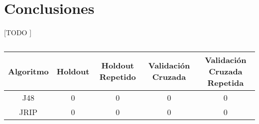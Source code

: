 \documentclass{article}
\begin{document}
	\section{Conclusiones}
	\label{sec:conclusions}

		\paragraph{}
		[TODO ]

		\begin{table}[h]
			\centering
			\begin{tabular}{ | c || c | c | c | c |}
			\hline
			Algoritmo	&	Holdout & Holdout Repetido 	& Validación Cruzada 	& Validación Cruzada Repetida \\ \hline \hline
			J48				&	0				&	0									&	0										&	0														\\ \hline
			JRIP			& 0				&	0									&	0										&	0														\\
			\hline
			\end{tabular}
			\caption{}
			\label{}

		\end{table}
	\nocite{garciparedes:machine-learning-hypothesis-evaluation}
	\nocite{subject:taa}
	\nocite{tool:weka}
  
  
\end{document}
